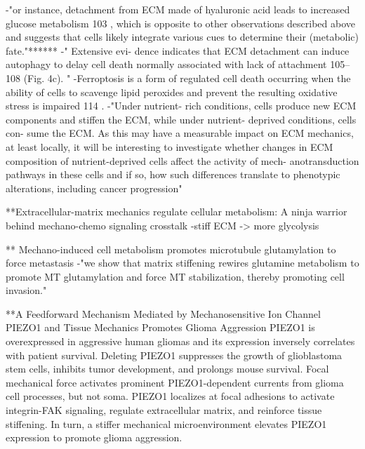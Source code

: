 \documentclass[11pt,a4paper]{article}
\begin{document}
-"or instance, detachment from ECM made of hyaluronic acid leads to increased glucose metabolism 103 , which is opposite to other observations described above and suggests that cells likely integrate various cues to determine their (metabolic) fate."******
-" Extensive evi-
dence indicates that ECM detachment can induce
autophagy to delay cell death normally associated with
lack of attachment 105–108 (Fig. 4c). "
-Ferroptosis is a form of regulated cell death occurring
when the ability of cells to scavenge lipid peroxides and
prevent the resulting oxidative stress is impaired 114 .
-"Under nutrient- rich conditions, cells
produce new ECM components and stiffen the ECM,
while under nutrient- deprived conditions, cells con-
sume the ECM. As this may have a measurable impact
on ECM mechanics, at least locally, it will be interesting
to investigate whether changes in ECM composition
of nutrient-deprived cells affect the activity of mech-
anotransduction pathways in these cells and if so, how
such differences translate to phenotypic alterations,
including cancer progression"

**Extracellular-matrix mechanics regulate cellular metabolism: A ninja warrior behind mechano-chemo signaling crosstalk
-stiff ECM -> more glycolysis

** Mechano-induced cell metabolism promotes microtubule glutamylation to force metastasis
-"we show that matrix stiffening rewires glutamine metabolism to promote MT glutamylation and force MT stabilization, thereby promoting cell invasion."

**A Feedforward Mechanism Mediated by Mechanosensitive Ion Channel PIEZO1 and Tissue Mechanics Promotes Glioma Aggression 
 PIEZO1 is overexpressed in aggressive human gliomas and its expression inversely correlates with patient survival. Deleting PIEZO1 suppresses the growth of glioblastoma stem cells, inhibits tumor development, and prolongs mouse survival. Focal mechanical force activates prominent PIEZO1-dependent currents from glioma cell processes, but not soma. PIEZO1 localizes at focal adhesions to activate integrin-FAK signaling, regulate extracellular matrix, and reinforce tissue stiffening. In turn, a stiffer mechanical microenvironment elevates PIEZO1 expression to promote glioma aggression.
 
\end{document}
